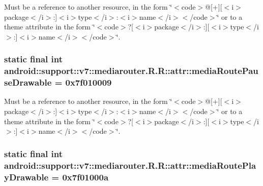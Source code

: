 Must be a reference to another resource, in the form \char`\"{}$<$code$>$@\mbox{[}+\mbox{]}\mbox{[}$<$i$>$package$<$/i$>$:\mbox{]}$<$i$>$type$<$/i$>$:$<$i$>$name$<$/i$>$$<$/code$>$\char`\"{} or to a theme attribute in the form \char`\"{}$<$code$>$?\mbox{[}$<$i$>$package$<$/i$>$:\mbox{]}\mbox{[}$<$i$>$type$<$/i$>$:\mbox{]}$<$i$>$name$<$/i$>$$<$/code$>$\char`\"{}. \hypertarget{classandroid_1_1support_1_1v7_1_1mediarouter_1_1_r_1_1attr_139e92a7ef9b7df6cc96bfe558de63ae}{
\subsubsection[{mediaRoutePauseDrawable}]{\setlength{\rightskip}{0pt plus 5cm}static final int android::support::v7::mediarouter.R.R::attr::mediaRoutePauseDrawable = 0x7f010009}}
\label{classandroid_1_1support_1_1v7_1_1mediarouter_1_1_r_1_1attr_139e92a7ef9b7df6cc96bfe558de63ae}


Must be a reference to another resource, in the form \char`\"{}$<$code$>$@\mbox{[}+\mbox{]}\mbox{[}$<$i$>$package$<$/i$>$:\mbox{]}$<$i$>$type$<$/i$>$:$<$i$>$name$<$/i$>$$<$/code$>$\char`\"{} or to a theme attribute in the form \char`\"{}$<$code$>$?\mbox{[}$<$i$>$package$<$/i$>$:\mbox{]}\mbox{[}$<$i$>$type$<$/i$>$:\mbox{]}$<$i$>$name$<$/i$>$$<$/code$>$\char`\"{}. \hypertarget{classandroid_1_1support_1_1v7_1_1mediarouter_1_1_r_1_1attr_6c98e91c4adec80d14b74879eed54889}{
\subsubsection[{mediaRoutePlayDrawable}]{\setlength{\rightskip}{0pt plus 5cm}static final int android::support::v7::mediarouter.R.R::attr::mediaRoutePlayDrawable = 0x7f01000a}}
\label{classandroid_1_1support_1_1v7_1_1mediarouter_1_1_r_1_1attr_6c98e91c4adec80d14b74879eed54889}


